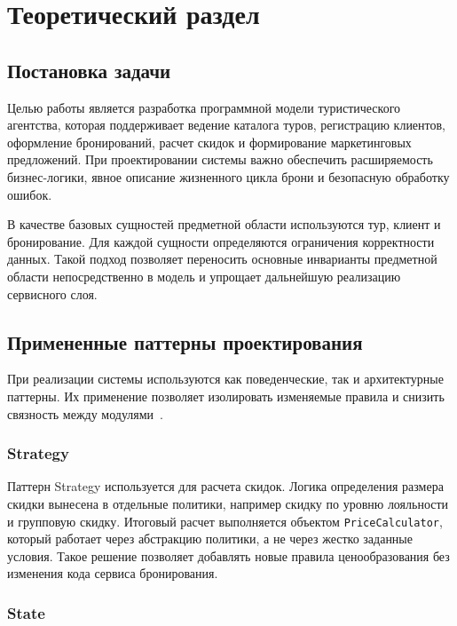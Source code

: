 \chapter{Теоретический раздел}

\section{Постановка задачи}

Целью работы является разработка программной модели туристического агентства,
которая поддерживает ведение каталога туров, регистрацию клиентов,
оформление бронирований, расчет скидок и формирование маркетинговых
предложений. При проектировании системы важно обеспечить расширяемость
бизнес-логики, явное описание жизненного цикла брони и безопасную обработку
ошибок.

В качестве базовых сущностей предметной области используются тур, клиент и
бронирование. Для каждой сущности определяются ограничения корректности
данных. Такой подход позволяет переносить основные инварианты предметной
области непосредственно в модель и упрощает дальнейшую реализацию сервисного
слоя.

\section{Примененные паттерны проектирования}

При реализации системы используются как поведенческие, так и архитектурные
паттерны. Их применение позволяет изолировать изменяемые правила и снизить
связность между модулями~\cite{gamma1995,fowler2002}.

\subsection{Strategy}

Паттерн Strategy используется для расчета скидок. Логика определения размера
скидки вынесена в отдельные политики, например скидку по уровню лояльности и
групповую скидку. Итоговый расчет выполняется объектом
\texttt{PriceCalculator}, который работает через абстракцию политики, а не
через жестко заданные условия. Такое решение позволяет добавлять новые правила
ценообразования без изменения кода сервиса бронирования.

\subsection{State}

